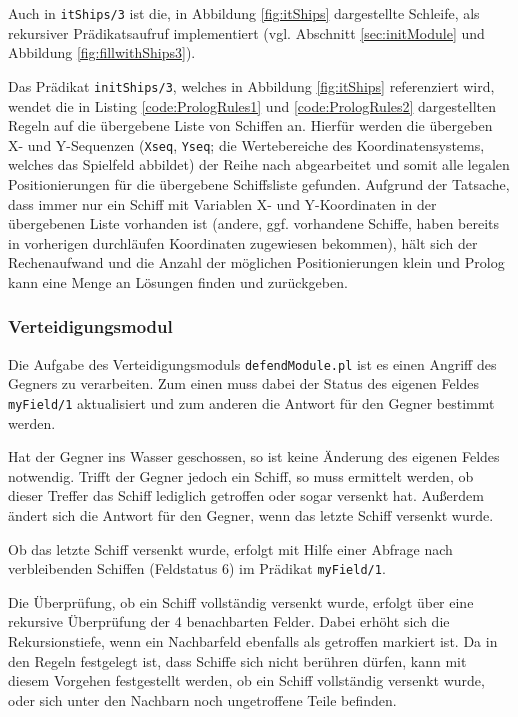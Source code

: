 	Auch in \texttt{itShips/3} ist die, in Abbildung \ref{fig:itShips} dargestellte Schleife, als rekursiver Prädikatsaufruf implementiert 
	(vgl. Abschnitt \ref{sec:initModule} und Abbildung \ref{fig:fillwithShips3}).
	
	Das Prädikat \texttt{initShips/3}, welches in Abbildung \ref{fig:itShips} referenziert wird, wendet die in Listing \ref{code:PrologRules1} 
	und \ref{code:PrologRules2} dargestellten 
	Regeln auf die übergebene Liste von Schiffen an. Hierfür werden die übergeben X- und Y-Sequenzen (\texttt{Xseq}, \texttt{Yseq}; die Wertebereiche des Koordinatensystems, 
	welches das Spielfeld abbildet) der Reihe nach abgearbeitet und somit alle legalen Positionierungen für die übergebene Schiffsliste gefunden. Aufgrund der 
	Tatsache, dass immer nur ein Schiff mit Variablen X- und Y-Koordinaten in der übergebenen Liste vorhanden ist (andere, ggf. vorhandene Schiffe, haben bereits 
	in vorherigen durchläufen Koordinaten zugewiesen bekommen), hält sich der Rechenaufwand und die Anzahl der möglichen Positionierungen klein und Prolog kann 
	eine Menge an Lösungen finden und zurückgeben.
\subsubsection{Verteidigungsmodul} \label{sec:defendModule}
	Die Aufgabe des Verteidigungsmoduls \texttt{defendModule.pl} ist es einen Angriff des Gegners zu verarbeiten.
	Zum einen muss dabei der Status des eigenen Feldes \texttt{myField/1} aktualisiert 
	und zum anderen die Antwort für den Gegner bestimmt werden.
	
	Hat der Gegner ins Wasser geschossen, so ist keine Änderung des eigenen Feldes notwendig. Trifft der Gegner jedoch ein Schiff,
	so muss ermittelt werden, ob dieser Treffer das Schiff lediglich getroffen oder sogar versenkt hat. Außerdem ändert sich die Antwort
	für den Gegner, wenn das letzte Schiff versenkt wurde.
	
	Ob das letzte Schiff versenkt wurde, erfolgt mit Hilfe einer Abfrage nach verbleibenden Schiffen (Feldstatus 6) im Prädikat \texttt{myField/1}.
	
	Die Überprüfung, ob ein Schiff vollständig versenkt wurde, erfolgt über eine rekursive Überprüfung der 4 benachbarten Felder.
	Dabei erhöht sich die Rekursionstiefe, wenn ein Nachbarfeld ebenfalls als getroffen markiert ist. 
	Da in den Regeln festgelegt ist, dass Schiffe sich nicht berühren dürfen, kann mit diesem Vorgehen festgestellt werden, ob ein Schiff
	vollständig versenkt wurde, oder sich unter den Nachbarn noch ungetroffene Teile befinden.
	
